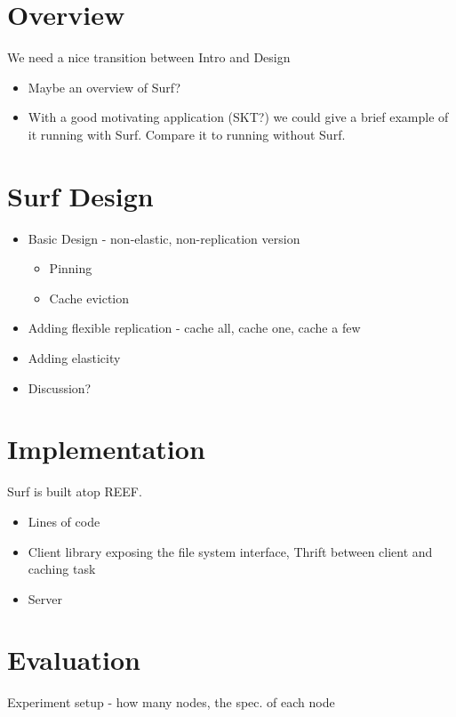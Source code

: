 \documentclass[twocolumn,10pt]{article}
\begin{document}
\section{Overview}

\noindent We need a nice transition between Intro and Design

\begin{itemize}
\item Maybe an overview of Surf?
\item With a good motivating application (SKT?) we could give a brief example of it running with Surf. Compare it to running without Surf.
\end{itemize}

\section{Surf Design}

\begin{itemize}
\item Basic Design - non-elastic, non-replication version
\begin{itemize}
\item Pinning
\item Cache eviction
\end{itemize}
\item Adding flexible replication - cache all, cache one, cache a few 
\item Adding elasticity
\item Discussion?
\end{itemize}


\section{Implementation}

Surf is built atop REEF\cite{reef}.

\begin{itemize}
\item Lines of code
\item Client library exposing the file system interface, Thrift between client and caching task
\item Server
\end{itemize}

\section{Evaluation}

\noindent Experiment setup - how many nodes, the spec. of each node
\end{document}
